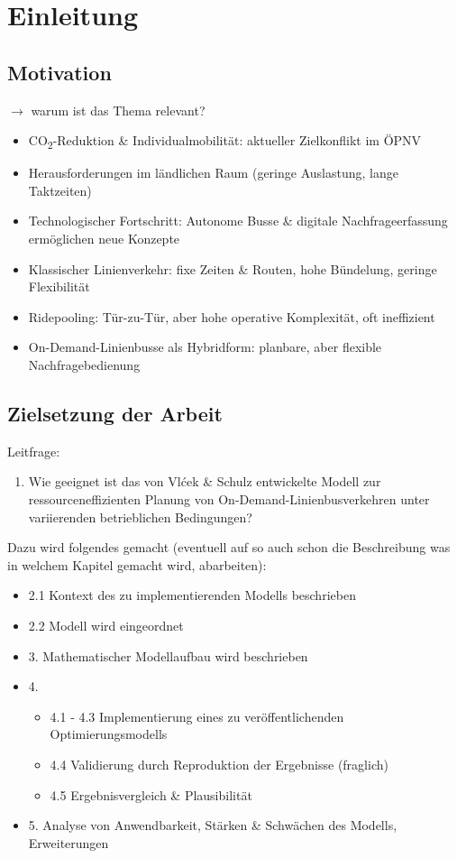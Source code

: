 \chapter{Einleitung}
\label{chapter:1}
\section{Motivation} 
\label{sec:1.1}
$\rightarrow$ warum ist das Thema relevant?


\begin{itemize}
    \item CO\textsubscript{2}-Reduktion \& Individualmobilität: aktueller Zielkonflikt im ÖPNV
    \item Herausforderungen im ländlichen Raum (geringe Auslastung, lange Taktzeiten)
    \item Technologischer Fortschritt: Autonome Busse \& digitale Nachfrageerfassung ermöglichen neue Konzepte
    \item Klassischer Linienverkehr: fixe Zeiten \& Routen, hohe Bündelung, geringe Flexibilität
    \item Ridepooling: Tür-zu-Tür, aber hohe operative Komplexität, oft ineffizient
    \item On-Demand-Linienbusse als Hybridform: planbare, aber flexible Nachfragebedienung
\end{itemize}
\section{Zielsetzung der Arbeit}
\label{sec:1.2}
Leitfrage:
\begin{enumerate}
    \item Wie geeignet ist das von Vlćek \& Schulz entwickelte Modell zur ressourceneffizienten Planung von On-Demand-Linienbusverkehren unter variierenden betrieblichen Bedingungen?
\end{enumerate}
\vspace{1em}
Dazu wird folgendes gemacht (eventuell auf so auch schon die Beschreibung was in welchem Kapitel gemacht wird, abarbeiten):
\begin{itemize}
    \item 2.1 Kontext des zu implementierenden Modells beschrieben
    \item 2.2 Modell wird eingeordnet
    \item 3. Mathematischer Modellaufbau wird beschrieben
    \item 4. 
    \begin{itemize}
        \item 4.1 - 4.3 Implementierung eines zu veröffentlichenden Optimierungsmodells
        \item 4.4 Validierung durch Reproduktion der Ergebnisse (fraglich)
        \item 4.5 Ergebnisvergleich \& Plausibilität
    \end{itemize} 
    \item 5. Analyse von Anwendbarkeit, Stärken \& Schwächen des Modells, Erweiterungen
\end{itemize}
